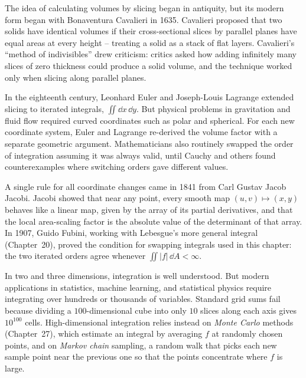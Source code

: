 \begin{historybox}
The idea of calculating volumes by slicing began in antiquity, but its modern
form began with Bonaventura Cavalieri in 1635. Cavalieri proposed
that two solids have identical volumes if their cross-sectional slices by parallel
planes have equal areas at every height -- treating a solid as a stack of flat
layers. Cavalieri's ``method of indivisibles'' drew criticism: critics asked how
adding infinitely many slices of zero thickness could produce a solid volume,
and the technique worked only when slicing along parallel planes.

In the eighteenth century, Leonhard Euler and Joseph-Louis Lagrange extended
slicing to iterated integrals, $\iint \dd x\,\dd y$. But physical problems
in gravitation and fluid flow required curved coordinates such as polar and
spherical. For each new coordinate system, Euler and Lagrange re-derived the
volume factor with a separate geometric argument. Mathematicians also routinely
swapped the order of integration assuming it was always valid, until Cauchy and others
found counterexamples where switching orders gave different values.

A single rule for all coordinate changes came in 1841 from Carl Gustav Jacob
Jacobi. Jacobi showed that near any point, every smooth map $(u,v)\mapsto(x,y)$ behaves
like a linear map, given by the array of its partial derivatives, and that the
local area-scaling factor is the absolute value of the determinant of that array.
In 1907, Guido Fubini, working with Lebesgue's more general integral (Chapter~20),
proved the condition for swapping integrals used in this chapter: the two
iterated orders agree whenever $\iint |f|\,\dd A < \infty$.

In two and three dimensions, integration is well understood. But modern applications
in statistics, machine learning, and statistical physics require integrating over
hundreds or thousands of variables. Standard grid sums fail because dividing a
$100$-dimensional cube into only $10$ slices along each axis gives $10^{100}$ cells.
High-dimensional integration relies instead on \emph{Monte Carlo} methods
(Chapter~27), which estimate an integral by averaging $f$ at randomly chosen
points, and on \emph{Markov chain} sampling, a random walk that picks each new
sample point near the previous one so that the points concentrate where $f$ is
large.
\end{historybox}

